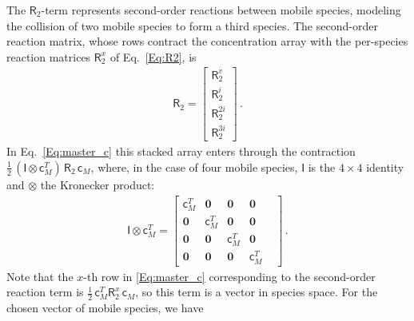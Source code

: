 \documentclass{article}
\newcommand{\spvec}[1]{\bm{\mathsf{#1}}}   %
\newcommand{\spmat}[1]{\bm{\mathsf{#1}}}   %
\begin{document}
The $\spmat{R}_2$-term represents second-order reactions between mobile species, modeling the collision of two mobile species to form a third species.
The second-order reaction matrix, whose rows contract the concentration array with the per-species reaction matrices $\spmat{R}_2^x$ of Eq.~\eqref{Eq:R2}, is
\begin{align}\label{eq:R2def}
\spmat{R}_2=\begin{bmatrix}
\spmat{R}_{2}^{v} \\
\spmat{R}_{2}^{i} \\
\spmat{R}_{2}^{2i} \\
\spmat{R}_{2}^{3i}
\end{bmatrix}\, .
\end{align}
In Eq.~\eqref{Eq:master_c} this stacked array enters through the contraction $\tfrac{1}{2}\,(\spmat{I}\otimes\spvec{c}_M^T)\,\spmat{R}_2\,\spvec{c}_{M}$, where, in the case of four mobile species, $\spmat{I}$ is the $4\times4$ identity and $\otimes$ the Kronecker product:
\begin{align}
\spmat{I}\otimes\spvec{c}_M^T=
\begin{bmatrix}
\spvec{c}_M^T&\bm 0&\bm 0&\bm 0\\
\bm 0&\spvec{c}_M^T&\bm 0&\bm 0\\
\bm 0&\bm 0&\spvec{c}_M^T&\bm 0&\\
\bm 0&\bm 0&\bm 0&\spvec{c}_M^T&
\end{bmatrix}\, .
\end{align}
Note that the $x$-th row in \eqref{Eq:master_c} corresponding to the second-order reaction term is $\tfrac{1}{2}\,\spvec{c}_M^T\spmat{R}_2^{x}\,\spvec{c}_{M}$, so this term is a vector in species space. 
 For the chosen vector of mobile species, we have
\end{document}
